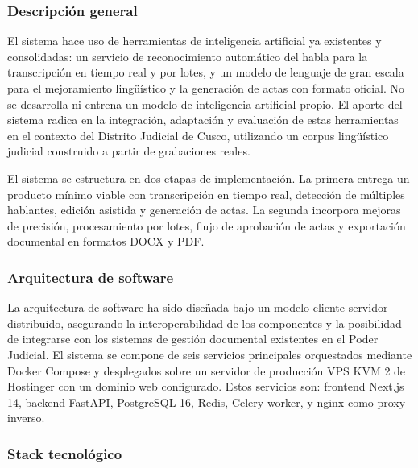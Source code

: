 \documentclass[12pt,a4paper,oneside]{article}
\begin{document}
\subsubsection{Descripci\'on general}

El sistema hace uso de herramientas de inteligencia artificial ya existentes y consolidadas: un servicio de reconocimiento autom\'atico del habla para la transcripci\'on en tiempo real y por lotes, y un modelo de lenguaje de gran escala para el mejoramiento ling\"u\'istico y la generaci\'on de actas con formato oficial. No se desarrolla ni entrena un modelo de inteligencia artificial propio. El aporte del sistema radica en la integraci\'on, adaptaci\'on y evaluaci\'on de estas herramientas en el contexto del Distrito Judicial de Cusco, utilizando un corpus ling\"u\'istico judicial construido a partir de grabaciones reales.

El sistema se estructura en dos etapas de implementaci\'on. La primera entrega un producto m\'inimo viable con transcripci\'on en tiempo real, detecci\'on de m\'ultiples hablantes, edici\'on asistida y generaci\'on de actas. La segunda incorpora mejoras de precisi\'on, procesamiento por lotes, flujo de aprobaci\'on de actas y exportaci\'on documental en formatos DOCX y PDF.

\subsubsection{Arquitectura de software}

La arquitectura de software ha sido dise\~nada bajo un modelo cliente-servidor distribuido, asegurando la interoperabilidad de los componentes y la posibilidad de integrarse con los sistemas de gesti\'on documental existentes en el Poder Judicial. El sistema se compone de seis servicios principales orquestados mediante Docker Compose y desplegados sobre un servidor de producci\'on VPS KVM 2 de Hostinger con un dominio web configurado. Estos servicios son: frontend Next.js 14, backend FastAPI, PostgreSQL 16, Redis, Celery worker, y nginx como proxy inverso.

\subsubsection{Stack tecnol\'ogico}
\end{document}
